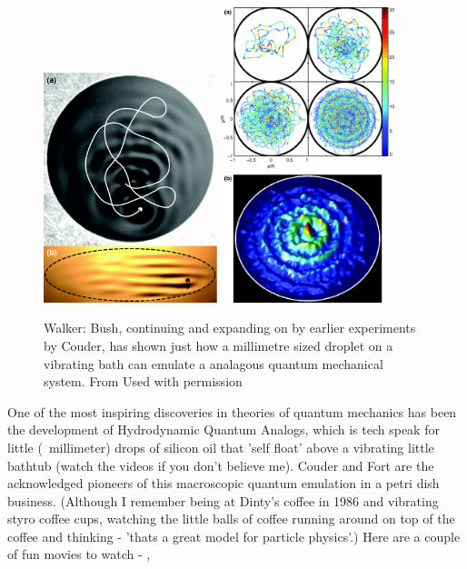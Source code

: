 \documentclass[../rzero]{subfiles}
\begin{document}
\begin{figure}
\includegraphics[width=0.45\textwidth]{chapters/images/bush-drop-path.png}
\includegraphics[width=0.45\textwidth]{chapters/images/bush-corral.png}
\caption{Walker: Bush, continuing and expanding on by earlier experiments by Couder, has shown just how a millimetre sized droplet on a vibrating bath can emulate a analagous quantum mechanical system. From\cite{harrisWavelikeStatisticsPilotwave2013} Used with permission}
\label{bushWalkerFigure}
\end{figure}

One of the most inspiring discoveries in theories of quantum mechanics has been the development of Hydrodynamic Quantum Analogs, which is tech speak for little (~millimeter) drops of silicon oil that 'self float' above a vibrating little bathtub (watch the videos if you don't believe me). Couder and Fort \cite{eddiInformationStoredFaraday2011} are the acknowledged pioneers of this macroscopic quantum emulation in a petri dish business. (Although I remember being at Dinty's coffee in 1986 and vibrating styro coffee cups, watching the little balls of coffee running around on top of the coffee and thinking - 'thats a great model for particle physics'.) Here are a couple of fun movies to watch - \cite{americanphysicalsocietyFaradayInstabilityFloating2014}, \cite{veritasiumThisWhatQuantum2016} 
\end{document}
